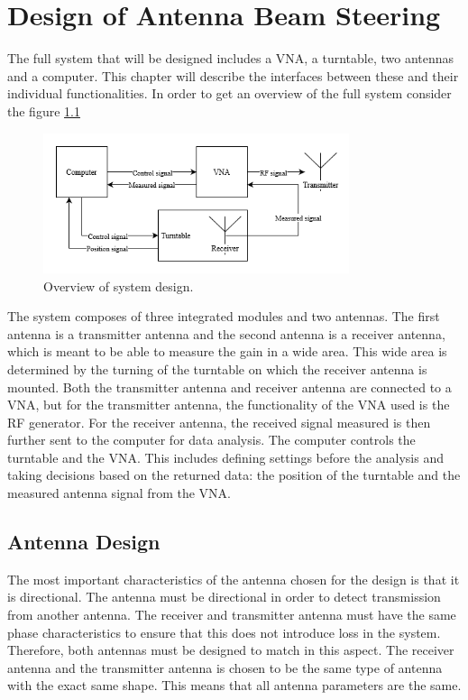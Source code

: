 \chapter{Design of Antenna Beam Steering} \label{ch:design}
The full system that will be designed includes a VNA, a turntable, two antennas and a computer. This chapter will describe the interfaces between these and their individual functionalities. In order to get an overview of the full system consider the figure \ref{fig:system_design}
\begin{figure}[H]
    \centering
    \includegraphics[width=0.8\textwidth]{figures/system_design.png}
    \caption{Overview of system design.} \label{fig:system_design}
\end{figure}
The system composes of three integrated modules and two antennas. The first antenna is a transmitter antenna and the second antenna is a receiver antenna, which is meant to be able to measure the gain in a wide area. This wide area is determined by the turning of the turntable on which the receiver antenna is mounted. Both the transmitter antenna and receiver antenna are connected to a VNA, but for the transmitter antenna, the functionality of the VNA used is the RF generator. For the receiver antenna, the received signal measured is then further sent to the computer for data analysis. The computer controls the turntable and the VNA. This includes defining settings before the analysis and taking decisions based on the returned data: the position of the turntable and the measured antenna signal from the VNA. 


\section{Antenna Design} \label{s:ant_design}
The most important characteristics of the antenna chosen for the design is that it is directional. The antenna must be directional in order to detect transmission from another antenna. The receiver and transmitter antenna must have the same phase characteristics to ensure that this does not introduce loss in the system. Therefore, both antennas must be designed to match in this aspect. The receiver antenna and the transmitter antenna is chosen to be the same type of antenna with the exact same shape. This means that all antenna parameters are the same. 

